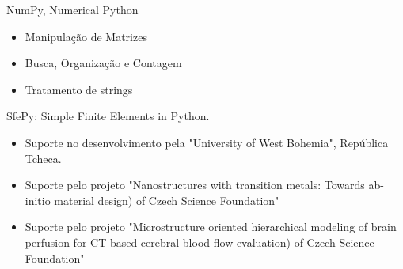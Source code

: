 \documentclass{beamer}
\begin{document}
\begin{frame}
    NumPy, Numerical Python
    \begin{itemize}
        \item Manipulação de Matrizes
        \item Busca, Organização e Contagem
        \item Tratamento de strings
    \end{itemize}
\end{frame}

\begin{frame}
    SfePy: Simple Finite Elements in Python.
    \begin{itemize}
        \item Suporte no desenvolvimento pela "University of West Bohemia", República Tcheca.
        \item Suporte pelo projeto "Nanostructures with transition metals: Towards ab-initio material design) of Czech Science Foundation"
        \item Suporte pelo projeto "Microstructure oriented hierarchical modeling of brain perfusion for CT based cerebral blood flow evaluation) of Czech Science Foundation"
    \end{itemize}
\end{frame}
\end{document}
